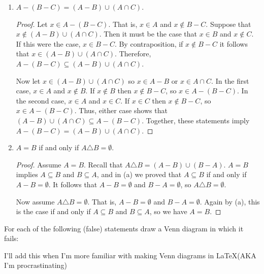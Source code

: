 \documentclass[class=report, crop=false]{standalone}
\begin{document}
\begin{solution}
\begin{enumerate}[label=({\alph*})]
      \item \(A - (B - C) = (A - B) \cup (A \cap C)\).

      \begin{proof}
        Let \(x \in A - (B - C)\). That is, \(x \in A\) and \(x \notin B - C\).
        Suppose that \(x \notin (A - B) \cup (A \cap C)\). Then it must be the case that \(x \in B\) and \(x \notin C\). If this were the case, \(x \in B - C\).
        By contraposition, if \(x \notin B - C\) it follows that \(x \in (A - B) \cup (A \cap C)\). Therefore, \(A - (B - C) \subseteq (A - B) \cup (A \cap C)\).

        Now let \(x \in (A - B) \cup (A \cap C)\) so \(x \in A - B\) or \(x \in A \cap C\).
        In the first case, \(x \in A\) and \(x \notin B\). If \(x \notin B\) then \(x \notin B - C\), so \(x \in A - (B - C)\).
        In the second case, \(x \in A\) and \(x \in C\). If \(x \in C\) then \(x \notin B - C\), so \(x \in A - (B - C)\).
        Thus, either case shows that \((A - B) \cup (A \cap C) \subseteq A - (B - C)\). Together, these statements imply \(A - (B - C) = (A - B) \cup (A \cap C)\).
      \end{proof}

      \item \(A = B\) if and only if \(A \triangle B = \emptyset\).

      \begin{proof}\renewcommand{\qedsymbol}{}
        Assume \(A = B\). Recall that \(A \triangle B = (A - B) \cup (B - A)\).
        \(A = B\) implies \(A \subseteq B\) and \(B \subseteq A\), and in (a) we proved that \(A \subseteq B\) if and only if \(A - B = \emptyset\).
        It follows that \(A - B = \emptyset\) and \(B - A = \emptyset\), so \(A \triangle B = \emptyset\).

        Now assume \(A \triangle B = \emptyset\). That is, \(A - B = \emptyset\) and \(B - A = \emptyset\). Again by (a), this is the case if and only if \(A \subseteq B\) and \(B \subseteq A\), so we have \(A = B\).
      \end{proof}
    \end{enumerate}
  \end{solution}

  \begin{problem}
    For each of the following (false) statements draw a Venn diagram in which it fails:
  \end{problem}

  \begin{solution}
    I'll add this when I'm more familiar with making Venn diagrams in \LaTeX (AKA I'm procrastinating)
  \end{solution}
\end{document}
